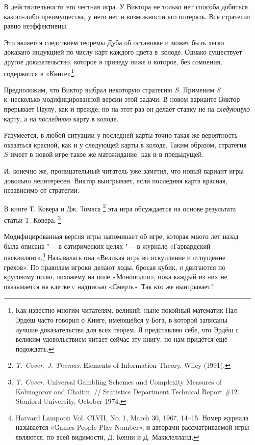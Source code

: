\documentclass[twoside]{book}
\begin{document}
В действительности это честная игра.
У Виктора не только нет способа добиться какого-либо преимущества, у него нет и возможности его потерять.
Все стратегии равно неэффективны.

Это является следствием теоремы Дуба об остановке %
и может быть легко доказано индукцией по числу карт каждого цвета в~колоде.
Однако существует другое доказательство, которое я приведу ниже и которое, без сомнения, содержится в «Книге»\footnote{Как известно многим читателям, великий, ныне покойный математик Пал Эрдёш часто говорил о Книге, имеющейся у Бога, в которой записаны лучшие доказательства для всех теорем.
Я представляю себе, что Эрдёш с великим удовольствием читает сейчас эту книгу, но нам придётся ещё подождать.}.

Предположим, что Виктор выбрал некоторую стратегию $S$.
Применим $S$ к~несколько модифицированной версии этой задачи.
В новом варианте Виктор прерывает Паулу, как и прежде, но на этот раз он делает ставку не на \emph{следующую} карту, а на \emph{последнюю} карту в колоде.

Разумеется, в любой ситуации у последней карты точно такая же вероятность оказаться красной, как и у следующей карты в колоде.
Таким образом, стратегия $S$ имеет в новой игре такое же матожидание, как и в предыдущей.

И, конечно же, проницательный читатель уже заметил, что новый вариант игры довольно неинтересен.
Виктор выигрывает, если последняя карта красная, независимо от стратегии.
\heart

В книге Т. Ковера и Дж. Томаса%
\footnote{\emph{T. Cover, J. Thomas}. {Elements of Information Theory}. Wiley (1991).} 
эта игра обсуждается на основе результата статьи Т. Ковера.%
\footnote{\emph{T. Cover}. Universal Gambling Schemes and Complexity Measures of Kolmogorov and Chaitin. /\!/ {Statistics Department Technical Report \#12}. Stanford University, October 1974.}

Модифицированная версия игры %
напоминает об игре, которая много лет назад была описана "--- в сатирических целях "--- в журнале «Гарвардский пасквилянт».\footnote{Harvard Lampoon Vol. CLVII, No. 1, March 30, 1967, 14--15.
Номер журнала называется «Games People Play Number», и авторами рассматриваемой игры являются, по всей видимости, Д. Кенни и Д. Макклелланд.%
}
Называлась она «Великая игра во искупление и отпущение грехов».
По правилам игроки делают ходы, бросая кубик, и двигаются по круговому полю, похожему на поле «Монополии», пока каждый из них не оказывается на клетке с надписью «Смерть».
Так кто же выигрывает?
\end{document}
